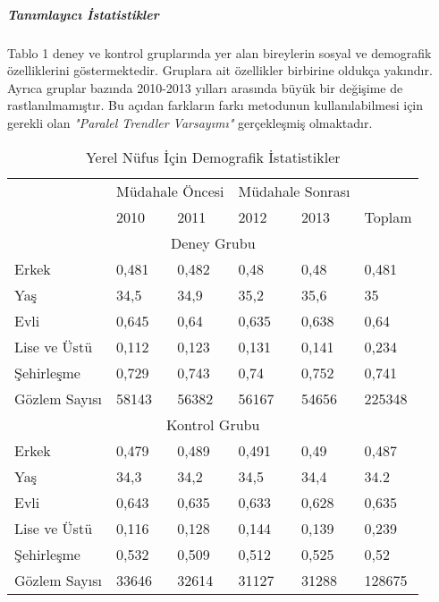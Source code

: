 \documentclass{article}
\begin{document}
    \newpage

    \subparagraph{Tanımlayıcı İstatistikler}
    \begin{justify}
        Tablo 1 deney ve kontrol gruplarında yer alan bireylerin sosyal ve demografik 
        özelliklerini göstermektedir. Gruplara ait özellikler birbirine oldukça yakındır.
        Ayrıca gruplar bazında 2010-2013 yılları arasında büyük bir değişime de rastlanılmamıştır.
        Bu açıdan farkların farkı metodunun kullanılabilmesi için gerekli olan 
        \textit{"Paralel Trendler Varsayımı"} gerçekleşmiş olmaktadır. 

        \FloatBarrier
        \begin{table}[h]
            \centering
            \caption{Yerel Nüfus İçin Demografik İstatistikler}
            \begin{tabular}{|llllll|}
            \hline
                 & \multicolumn{2}{|c|}{Müdahale Öncesi} & \multicolumn{2}{|c|}{Müdahale Sonrası} &\\
                 & 2010 & 2011 & 2012 & 2013 & Toplam \\ \hline
                \multicolumn{6}{|c|}{Deney Grubu}\\ \hline
                Erkek  & 0,481 & 0,482 & 0,48 & 0,48 & 0,481 \\ 
                Yaş & 34,5 & 34,9 & 35,2 & 35,6 & 35 \\ 
                Evli & 0,645 & 0,64 & 0,635 & 0,638 & 0,64 \\ 
                Lise ve Üstü & 0,112 & 0,123 & 0,131 & 0,141 & 0,234 \\ 
                Şehirleşme & 0,729 & 0,743 & 0,74 & 0,752 & 0,741 \\ 
                Gözlem Sayısı & 58143 & 56382 & 56167 & 54656 & 225348 \\ \hline 
                \multicolumn{6}{|c|}{Kontrol Grubu}\\ \hline
                Erkek  & 0,479 & 0,489 & 0,491 & 0,49 & 0,487 \\
                Yaş & 34,3 & 34,2 & 34,5 & 34,4 & 34.2 \\ 
                Evli & 0,643 & 0,635 & 0,633 & 0,628 & 0,635 \\ 
                Lise ve Üstü & 0,116 & 0,128 & 0,144 & 0,139 & 0,239 \\ 
                Şehirleşme & 0,532 & 0,509 & 0,512 & 0,525 & 0,52 \\ 
                Gözlem Sayısı & 33646 & 32614 & 31127 & 31288 & 128675 \\ \hline
            \end{tabular}
        \end{table}
        \FloatBarrier


\end{justify}
\end{document}

